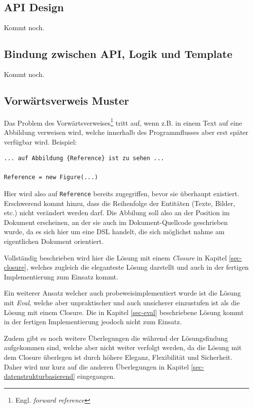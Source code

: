 \subsection{API Design}\label{sec-apiDesign}

Kommt noch.

\subsection{Bindung zwischen API, Logik und Template}

Kommt noch.

\subsection{Vorwärtsverweis Muster}\label{sec-forwardreference}

Das Problem des
Vorwärtsverweises\footnote{Engl. \emph{forward reference}} tritt auf,
wenn z.B. in einem Text auf eine Abbildung
verweisen wird, welche innerhalb des Programmflusses aber erst später verfügbar
wird. Beispiel:

\begin{lstlisting}
... auf Abbildung {Reference} ist zu sehen ...

Reference = new Figure(...)
\end{lstlisting}

Hier wird also auf \lstinline|Reference| bereits zugegriffen,
bevor sie überhaupt existiert. Erschwerend kommt hinzu, dass die
Reihenfolge der Entitäten (Texte, Bilder, etc.) nicht verändert werden darf.
Die Abbilung soll also an der Position im Dokument erscheinen, an der sie
auch im Dokument-Quellcode geschrieben wurde, da es sich hier um eine DSL
handelt, die sich möglichst nahme am eigentlichen Dokument orientiert.

Vollständig beschrieben wird hier die Lösung mit einem \emph{Closure} in
Kapitel \ref{sec-closure}, welches zugleich die eleganteste Lösung darstellt
und auch in der fertigen Implementierung zum Einsatz kommt.

Ein weiterer Ansatz welcher auch probeweisimplementiert wurde ist die Lösung
mit \emph{Eval}, welche aber unpraktischer und auch unsicherer einzustufen
ist als die Lösung mit einem Closure. Die in Kapitel \ref{sec-eval}
beschriebene Lösung kommt in der fertigen Implementierung jeodoch nicht
zum Einsatz.

Zudem gibt es noch weitere Überlegungen die während der Lösungsfindung
aufgekommen sind, welche aber nicht weiter verfolgt werden, da die Lösung
mit dem Closure überlegen ist durch höhere Eleganz, Flexibilität und
Sicherheit. Daher wird nur kurz auf die anderen Überlegungen in
Kapitel \ref{sec-datenstrukturbasierend} eingegangen.

